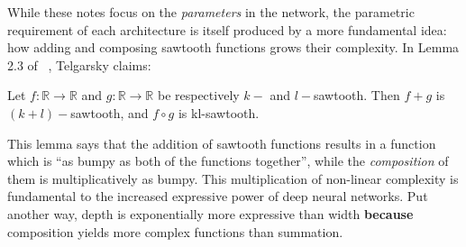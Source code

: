 \documentclass{article}
\begin{document}
While these notes focus on the \textit{parameters} in the network, the parametric requirement of each architecture is itself produced by a more fundamental idea: how adding and composing sawtooth functions grows their complexity. In Lemma 2.3 of ~\citep{telgarsky2015representation}, Telgarsky claims:

\begin{lemma}
Let $f: \mathbb{R} \to \mathbb{R}$ and $g: \mathbb{R} \to \mathbb{R}$ be respectively $k-$ and $l-$sawtooth. Then $f + g$ is $(k + l)-$sawtooth, and $f \circ g$ is kl-sawtooth.
\end{lemma}

This lemma says that the addition of sawtooth functions results in a function which is ``as bumpy as both of the functions together'', while the \textit{composition} of them is multiplicatively as bumpy. This multiplication of non-linear complexity is fundamental to the increased expressive power of deep neural networks. Put another way, depth is exponentially more expressive than width \textbf{because} composition yields more complex functions than summation.










\end{document}

